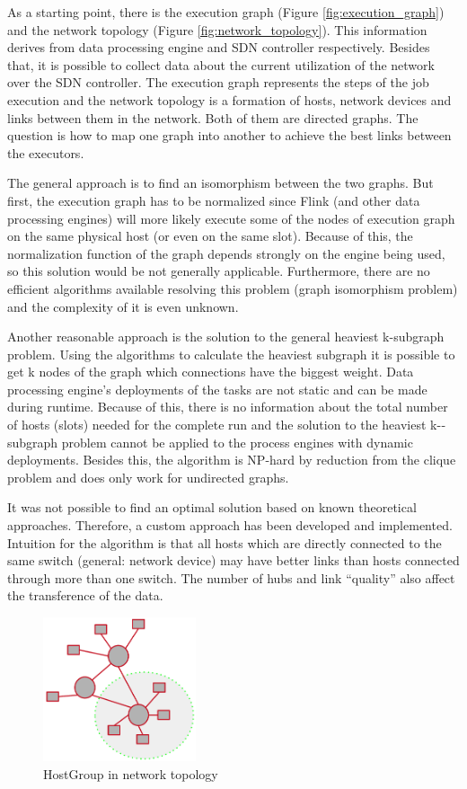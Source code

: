 As a starting point, there is the execution graph (Figure \ref{fig:execution_graph}) and the network
topology (Figure \ref{fig:network_topology}).  This information derives from data processing engine
and SDN controller respectively. Besides that, it is possible to collect data about the current
utilization of the network over the SDN controller.  The execution graph represents the steps of the
job execution and the network topology is a formation of hosts, network devices and links between
them in the network. Both of them are directed graphs. The question is how to map one graph
into another to achieve the best links between the executors.

The general approach is to find an isomorphism between the two graphs. But first, the execution
graph has to be normalized since Flink (and other data processing engines) will more likely execute
some of the nodes of execution graph on the same physical host (or even on the same slot). Because
of this, the normalization function of the graph depends strongly on the engine being used, so this
solution would be not generally applicable. Furthermore, there are no efficient algorithms available
resolving this problem (graph isomorphism problem) and the complexity of it is even unknown. \cite{graph}

Another reasonable approach is the solution to the general heaviest k-subgraph problem. Using the
algorithms to calculate the heaviest subgraph it is possible to get k nodes of the graph which
connections have the biggest weight. Data processing engine’s deployments of the tasks are not
static and can be made during runtime. Because of this, there is no information about the total
number of hosts (slots) needed for the complete run and the solution to the heaviest k-­subgraph
problem cannot be applied to the process engines with dynamic deployments. Besides this, the
algorithm is NP­-hard by reduction from the clique problem and does only work for undirected graphs. \cite{ksubgraph}

It was not possible to find an optimal solution based on known theoretical approaches. Therefore, a
custom approach has been developed and implemented. Intuition for the algorithm is that
all hosts which are directly connected to the same switch (general: network device) may have better
links than hosts connected through more than one switch. The number of hubs and link “quality” also
affect the transference of the data.

\begin{figure}[h]
    \centering
    \includegraphics[width=0.4\textwidth]{graphics/hostgroup.png}
    \caption{HostGroup in network topology}
    \label{fig:hostgroup}
\end{figure}

